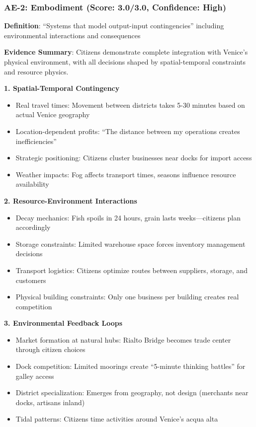 \documentclass[12pt,a4paper]{article}
\begin{document}
\subsubsection{AE-2: Embodiment (Score: 3.0/3.0, Confidence: High)}

\textbf{Definition}: ``Systems that model output-input contingencies'' including environmental interactions and consequences

\textbf{Evidence Summary}: Citizens demonstrate complete integration with Venice's physical environment, with all decisions shaped by spatial-temporal constraints and resource physics.

\textbf{1. Spatial-Temporal Contingency}
\begin{itemize}
    \item Real travel times: Movement between districts takes 5-30 minutes based on actual Venice geography
    \item Location-dependent profits: ``The distance between my operations creates inefficiencies''
    \item Strategic positioning: Citizens cluster businesses near docks for import access
    \item Weather impacts: Fog affects transport times, seasons influence resource availability
\end{itemize}

\textbf{2. Resource-Environment Interactions}
\begin{itemize}
    \item Decay mechanics: Fish spoils in 24 hours, grain lasts weeks—citizens plan accordingly
    \item Storage constraints: Limited warehouse space forces inventory management decisions
    \item Transport logistics: Citizens optimize routes between suppliers, storage, and customers
    \item Physical building constraints: Only one business per building creates real competition
\end{itemize}

\textbf{3. Environmental Feedback Loops}
\begin{itemize}
    \item Market formation at natural hubs: Rialto Bridge becomes trade center through citizen choices
    \item Dock competition: Limited moorings create ``5-minute thinking battles'' for galley access
    \item District specialization: Emerges from geography, not design (merchants near docks, artisans inland)
    \item Tidal patterns: Citizens time activities around Venice's acqua alta
\end{itemize}
\end{document}
